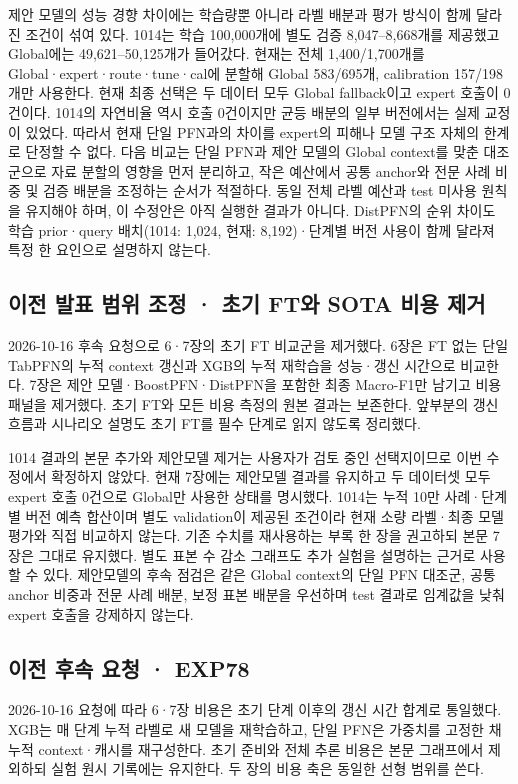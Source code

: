 제안 모델의 성능 경향 차이에는 학습량뿐 아니라 라벨 배분과 평가 방식이 함께 달라진 조건이 섞여 있다. 1014는 학습 100,000개에 별도 검증 8,047–8,668개를 제공했고 Global에는 49,621–50,125개가 들어갔다. 현재는 전체 1,400/\allowbreak{}1,700개를 Global·expert·route·tune·cal에 분할해 Global 583/\allowbreak{}695개, calibration 157/\allowbreak{}198개만 사용한다. 현재 최종 선택은 두 데이터 모두 Global fallback이고 expert 호출이 0건이다. 1014의 자연비율 역시 호출 0건이지만 균등 배분의 일부 버전에서는 실제 교정이 있었다. 따라서 현재 단일 PFN과의 차이를 expert의 피해나 모델 구조 자체의 한계로 단정할 수 없다. 다음 비교는 단일 PFN과 제안 모델의 Global context를 맞춘 대조군으로 자료 분할의 영향을 먼저 분리하고, 작은 예산에서 공통 anchor와 전문 사례 비중 및 검증 배분을 조정하는 순서가 적절하다. 동일 전체 라벨 예산과 test 미사용 원칙을 유지해야 하며, 이 수정안은 아직 실행한 결과가 아니다. DistPFN의 순위 차이도 학습 prior·query 배치(1014: 1,024, 현재: 8,192)·단계별 버전 사용이 함께 달라져 특정 한 요인으로 설명하지 않는다.

\subsection{이전 발표 범위 조정 · 초기 FT와 SOTA 비용 제거}
2026-10-16 후속 요청으로 6·7장의 초기 FT 비교군을 제거했다. 6장은 FT 없는 단일 TabPFN의 누적 context 갱신과 XGB의 누적 재학습을 성능·갱신 시간으로 비교한다. 7장은 제안 모델·BoostPFN·DistPFN을 포함한 최종 Macro-F1만 남기고 비용 패널을 제거했다. 초기 FT와 모든 비용 측정의 원본 결과는 보존한다. 앞부분의 갱신 흐름과 시나리오 설명도 초기 FT를 필수 단계로 읽지 않도록 정리했다.

1014 결과의 본문 추가와 제안모델 제거는 사용자가 검토 중인 선택지이므로 이번 수정에서 확정하지 않았다. 현재 7장에는 제안모델 결과를 유지하고 두 데이터셋 모두 expert 호출 0건으로 Global만 사용한 상태를 명시했다. 1014는 누적 10만 사례·단계별 버전 예측 합산이며 별도 validation이 제공된 조건이라 현재 소량 라벨·최종 모델 평가와 직접 비교하지 않는다. 기존 수치를 재사용하는 부록 한 장을 권고하되 본문 7장은 그대로 유지했다. 별도 표본 수 감소 그래프도 추가 실험을 설명하는 근거로 사용할 수 있다. 제안모델의 후속 점검은 같은 Global context의 단일 PFN 대조군, 공통 anchor 비중과 전문 사례 배분, 보정 표본 배분을 우선하며 test 결과로 임계값을 낮춰 expert 호출을 강제하지 않는다.

\subsection{이전 후속 요청 · EXP78}
2026-10-16 요청에 따라 6·7장 비용은 초기 단계 이후의 갱신 시간 합계로 통일했다. XGB는 매 단계 누적 라벨로 새 모델을 재학습하고, 단일 PFN은 가중치를 고정한 채 누적 context·캐시를 재구성한다. 초기 준비와 전체 추론 비용은 본문 그래프에서 제외하되 실험 원시 기록에는 유지한다. 두 장의 비용 축은 동일한 선형 범위를 쓴다.

